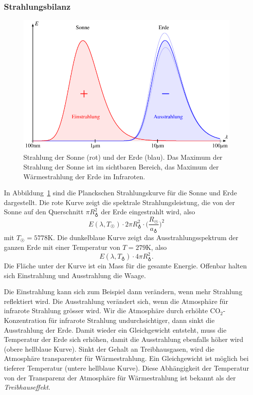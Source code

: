 \subsubsection{Strahlungsbilanz}
\begin{figure}
\centering
\includegraphics{chapters/1/vergleich.pdf}
\caption{Strahlung der Sonne (rot) und der Erde (blau).
Das Maximum der Strahlung der Sonne ist im sichtbaren Bereich,
das Maximum der Wärmestrahlung der Erde im Infraroten.
\label{skript:strahlung-sonne-erde}}
\end{figure}%
In Abbildung~\ref{skript:strahlung-sonne-erde} sind die Planckschen
Strahlungskurve für die Sonne und Erde dargestellt.
Die rote Kurve zeigt die spektrale Strahlungsleistung, die von der
Sonne auf den Querschnitt $\pi R_{\earth}^2$ der Erde eingestrahlt wird,
also
\[
E(\lambda,T_{\astrosun}) \cdot 2\pi R_{\earth}^2
\cdot
\biggl(\frac{R_{\astrosun}}{a_{\earth}}\biggr)^2
\]
mit $T_{\astrosun}=5778\text{K}$.
Die dunkelblaue Kurve zeigt das Ausstrahlungsspektrum der ganzen Erde mit
einer Temperatur von $T=279\text{K}$, also
\[
E(\lambda,T_{\earth})\cdot 4\pi R_{\earth}^2.
\]
Die Fläche unter der Kurve ist ein Mass für die gesamte Energie.
Offenbar halten sich Einstrahlung und Ausstrahlung die Waage.

Die Einstrahlung kann sich zum Beispiel dann verändern, wenn 
mehr Strahlung reflektiert wird.
Die Ausstrahlung verändert sich, wenn die Atmosphäre für infrarote
Strahlung grösser wird.
Wir die Atmosphäre durch erhöhte $\text{CO}_2$-Konzentration für
infrarote Strahlung undurchsichtiger, dann sinkt die Ausstrahlung
der Erde.
Damit wieder ein Gleichgewicht entsteht, muss die Temperatur der
Erde sich erhöhen, damit die Ausstrahlung ebenfalls höher wird
(obere hellblaue Kurve).
Sinkt der Gehalt an Treibhausgasen, wird die Atmosphäre transparenter
für Wärmestrahlung.
Ein Gleichgewicht ist möglich bei tieferer Temperatur (untere
hellblaue Kurve).
Diese Abhängigkeit der Temperatur von der Transparenz der
Atmosphäre für Wärmestrahlung ist bekannt als der {\em Treibhauseffekt}.

